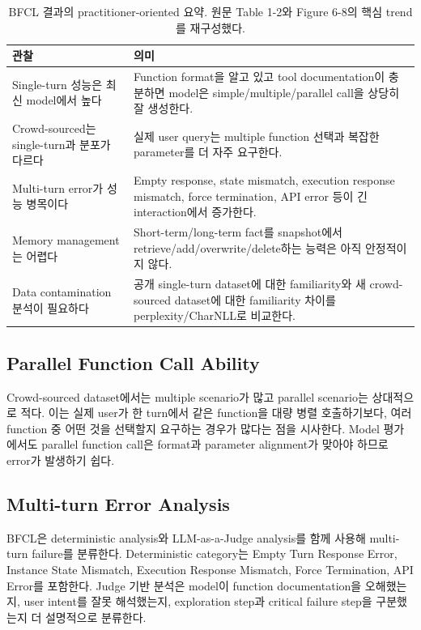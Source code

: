 \documentclass[11pt]{article}
\begin{document}
\begin{table}[h]
\centering
\begin{tabularx}{\textwidth}{p{}X}
\toprule
관찰 & 의미 \\
\midrule
Single-turn 성능은 최신 model에서 높다 & Function format을 알고 있고 tool documentation이 충분하면 model은 simple/multiple/parallel call을 상당히 잘 생성한다. \\
Crowd-sourced는 single-turn과 분포가 다르다 & 실제 user query는 multiple function 선택과 복잡한 parameter를 더 자주 요구한다. \\
Multi-turn error가 성능 병목이다 & Empty response, state mismatch, execution response mismatch, force termination, API error 등이 긴 interaction에서 증가한다. \\
Memory management는 어렵다 & Short-term/long-term fact를 snapshot에서 retrieve/add/overwrite/delete하는 능력은 아직 안정적이지 않다. \\
Data contamination 분석이 필요하다 & 공개 single-turn dataset에 대한 familiarity와 새 crowd-sourced dataset에 대한 familiarity 차이를 perplexity/CharNLL로 비교한다. \\
\bottomrule
\end{tabularx}
\caption{BFCL 결과의 practitioner-oriented 요약. 원문 Table 1-2와 Figure 6-8의 핵심 trend를 재구성했다.}
\end{table}

\subsection{Parallel Function Call Ability}
Crowd-sourced dataset에서는 multiple scenario가 많고 parallel scenario는 상대적으로 적다. 이는 실제 user가 한 turn에서 같은 function을 대량 병렬 호출하기보다, 여러 function 중 어떤 것을 선택할지 요구하는 경우가 많다는 점을 시사한다. Model 평가에서도 parallel function call은 format과 parameter alignment가 맞아야 하므로 error가 발생하기 쉽다.

\subsection{Multi-turn Error Analysis}
BFCL은 deterministic analysis와 LLM-as-a-Judge analysis를 함께 사용해 multi-turn failure를 분류한다. Deterministic category는 Empty Turn Response Error, Instance State Mismatch, Execution Response Mismatch, Force Termination, API Error를 포함한다. Judge 기반 분석은 model이 function documentation을 오해했는지, user intent를 잘못 해석했는지, exploration step과 critical failure step을 구분했는지 더 설명적으로 분류한다.
\end{document}
